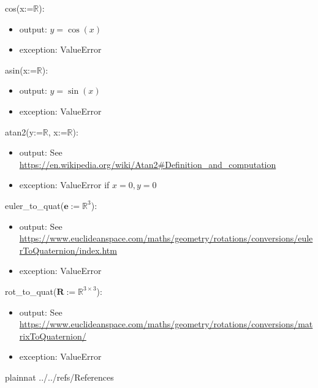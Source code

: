 \documentclass[12pt, titlepage]{article}
\begin{document}
\noindent cos(x:=$\mathbb{R}$):
\begin{itemize}
\item output: $y = \cos(x)$
\item exception: ValueError
\end{itemize}

\noindent asin(x:=$\mathbb{R}$):
\begin{itemize}
\item output: $y = \sin(x)$
\item exception: ValueError
\end{itemize}

\noindent atan2(y:=$\mathbb{R}$, x:=$\mathbb{R}$):
\begin{itemize}
\item output: See \url{https://en.wikipedia.org/wiki/Atan2#Definition_and_computation}
\item exception: ValueError if $x =0, y =0$
\end{itemize}

\noindent euler\_to\_quat($\mathbf{e}:=\mathbb{R}^3$):
\begin{itemize}
\item output: See \url{https://www.euclideanspace.com/maths/geometry/rotations/conversions/eulerToQuaternion/index.htm}
\item exception: ValueError
\end{itemize}

\noindent rot\_to\_quat($\mathbf{R} := \mathbb{R}^{3 \times 3}$):
\begin{itemize}
\item output: See \url{https://www.euclideanspace.com/maths/geometry/rotations/conversions/matrixToQuaternion/}
\item exception: ValueError
\end{itemize}

\newpage

 {plainnat}
 {../../refs/References}

\end{document}
